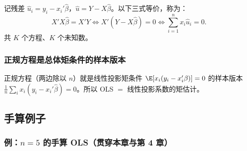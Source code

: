 \begin{defn}[正规方程]\label{def:U03-normal}
记残差 $\hat u_i=y_i-x_i'\hat\beta$，$\hat u=Y-X\hat\beta$。以下三式等价，称为：
\[
X'X\hat\beta=X'Y\iff X'(Y-X\hat\beta)=0\iff \sum_{i=1}^n x_i\hat u_i=0 .
\]
共 $K$ 个方程、$K$ 个未知数。
\end{defn}

\subsubsection{正规方程是总体矩条件的样本版本}

正规方程（两边除以 $n$）就是线性投影矩条件 $\E[x_i(y_i-x_i'\beta)]=0$ 的样本版本 $\frac1n\sum_ix_i(y_i-x_i'\hat\beta)=0$。所以 OLS $=$ 线性投影系数的矩估计。

\subsection{手算例子}

\subsubsection{例：\texorpdfstring{$n=5$}{n=5} 的手算 OLS（贯穿本章与第 4 章）}

